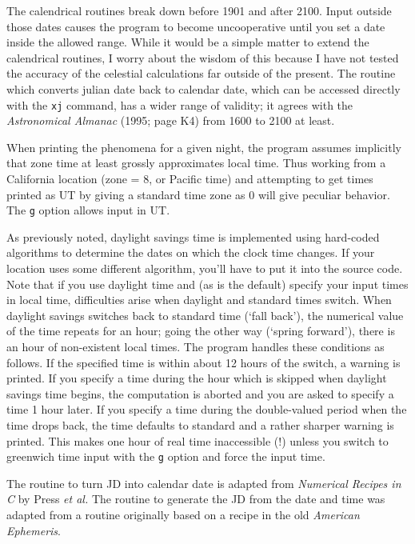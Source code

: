 The calendrical routines break down before 1901 and after 2100. Input 
outside those dates causes the program to become uncooperative until you 
set a date inside the allowed range.  While it would be a simple matter 
to extend the calendrical routines, I worry about the wisdom of this 
because I have not tested the accuracy of the celestial calculations far 
outside of the present.  The routine which converts julian date
back to calendar date, which can be accessed directly with the {\tt xj}
command, has a wider range of validity; it agrees with the {\it Astronomical
Almanac} (1995; page K4) from 1600 to 2100 at least.
\par
When printing the phenomena for a given night, the program assumes 
implicitly that zone time at least grossly approximates 
local time.  Thus working from a California location (zone = 8, or 
Pacific time) and attempting to get times printed as UT by giving a 
standard time zone as 0 will give peculiar behavior.  The {\tt g} option 
allows input in UT.
\par
As previously noted, daylight savings time is implemented using hard-coded 
algorithms to determine the dates on which the clock time changes.  If your 
location uses some different algorithm, you'll have to put it into the 
source code.   Note that if you use daylight time and (as is the default)
specify your input times in local time, difficulties arise when daylight 
and standard times switch.  When daylight savings switches back to standard 
time (`fall back'), the numerical value of the time repeats for an hour; going the other 
way (`spring forward'), there is an hour of non-existent local times.  The program handles these 
conditions as follows.  If the specified time is within about 12 hours of 
the switch, a warning is printed.  If you specify a time during the hour 
which is skipped when daylight savings time begins, the computation is 
aborted and you are asked to specify a time 1 hour later.  If you specify 
a time during the double-valued period when the time drops back, the time 
defaults to standard and a rather sharper warning is printed.   This makes 
one hour of real time inaccessible (!) unless you switch to greenwich time 
input with the {\tt g} option and force the input time.
\par
The routine to turn JD into calendar date is adapted from {\it Numerical 
Recipes in C\/} by Press {\it et al.}  The routine to generate the JD from 
the date and time was adapted from a routine originally based on a recipe 
in the old {\it American Ephemeris}.
\par

